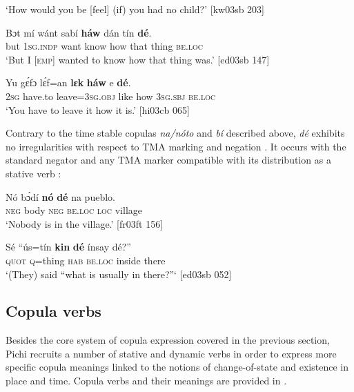 \glt ‘How would you be [feel] (if) you had no child?’ [kw03sb 203]
\z


\ea%
    \label{ex:key:791}
    \gll Bɔt  mí    wánt  sabí    \textbf{háw}    dán    tín    \textbf{dé}.\\
but  \textsc{1sg.indp}  want  know  how    that    thing  \textsc{be.loc}\\

\glt ‘But I \textsc{[emp]} wanted to know how that thing was.’ [ed03sb 147]
\z


\ea%
    \label{ex:key:792}
    \gll Yu  gɛ́fɔ    lɛ́f=an    \textbf{lɛk}  \textbf{háw}    e    \textbf{dé}.\\
\textsc{2sg}  have.to  leave=\textsc{3sg.obj}  like  how    \textsc{3sg.sbj}  \textsc{be.loc}\\

\glt ‘You have to leave it how it is.’ [hi03cb 065]
\z

Contrary to the time stable copulas \textit{na}\textit{\textup{/}}\textit{nóto} and \textit{bí} described above, \textit{dé} exhibits no irregularities with respect to \textsc{TMA} marking and negation . It occurs with the standard negator and any \textsc{TMA} marker compatible with its distribution as a stative verb :


\ea%
    \label{ex:key:793}
    \gll Nó  bɔ́dí    \textbf{nó}  \textbf{dé}    na  pueblo.\\
\textsc{neg}  body  \textsc{neg}  \textsc{be.loc}  \textsc{loc}  village\\

\glt ‘Nobody is in the village.’ [fr03ft 156]
\z


\ea%
    \label{ex:key:794}
    \gll Sé  “ús=tín  \textbf{kin}  \textbf{dé}   ínsay  dé?”\\
\textsc{quot}  \textsc{q}=thing  \textsc{hab}  \textsc{be.loc}  inside  there\\

\glt ‘(They) said “what is usually in there?”‘ [ed03sb 052]
\z

\subsection{Copula verbs}\label{sec:7.6.2}

Besides the core system of copula expression covered in the previous section, Pichi recruits a number of stative and dynamic verbs in order to express more specific copula meanings linked to the notions of change-of-state and existence in place and time. Copula verbs and their meanings are provided in .

